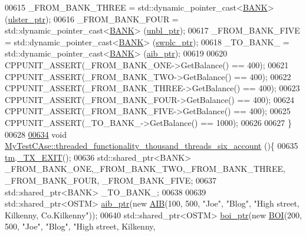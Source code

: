 \begin{DoxyCode}
00615     \_FROM\_BANK\_THREE = std::dynamic\_pointer\_cast<\hyperlink{class_b_a_n_k}{BANK}> (\hyperlink{class_my_test_c_ase_a4f9f72374d3d15be7cdf16412c4d7ed3_a4f9f72374d3d15be7cdf16412c4d7ed3}{ulster\_ptr});
00616     \_FROM\_BANK\_FOUR = std::dynamic\_pointer\_cast<\hyperlink{class_b_a_n_k}{BANK}> (\hyperlink{class_my_test_c_ase_a0ca634b597d6c0e136d632268853d5a7_a0ca634b597d6c0e136d632268853d5a7}{unbl\_ptr});
00617     \_FROM\_BANK\_FIVE = std::dynamic\_pointer\_cast<\hyperlink{class_b_a_n_k}{BANK}> (\hyperlink{class_my_test_c_ase_aa8ccae9a5a7feb5bc47591c55a82d0cd_aa8ccae9a5a7feb5bc47591c55a82d0cd}{swplc\_ptr});
00618     \_TO\_BANK\_ = std::dynamic\_pointer\_cast<\hyperlink{class_b_a_n_k}{BANK}> (\hyperlink{class_my_test_c_ase_adad50e8278b64aa0321000b528e5362c_adad50e8278b64aa0321000b528e5362c}{aib\_ptr});
00619     
00620     CPPUNIT\_ASSERT(\_FROM\_BANK\_ONE->GetBalance() == 400);
00621     CPPUNIT\_ASSERT(\_FROM\_BANK\_TWO->GetBalance() == 400);
00622     CPPUNIT\_ASSERT(\_FROM\_BANK\_THREE->GetBalance() == 400);
00623     CPPUNIT\_ASSERT(\_FROM\_BANK\_FOUR->GetBalance() == 400);
00624     CPPUNIT\_ASSERT(\_FROM\_BANK\_FIVE->GetBalance() == 400);
00625     CPPUNIT\_ASSERT(\_TO\_BANK\_->GetBalance() == 1000);
00626     
00627 \}
00628 
\hypertarget{_my_test_c_ase_8cpp_source.tex_l00634}{}\hyperlink{class_my_test_c_ase_ab7d15a71958588c6402f234e106668b1_ab7d15a71958588c6402f234e106668b1}{00634} \textcolor{keywordtype}{void} \hyperlink{class_my_test_c_ase_ab7d15a71958588c6402f234e106668b1_ab7d15a71958588c6402f234e106668b1}{MyTestCAse::threaded\_functionality\_thousand\_threads\_six\_account}
      ()\{
00635     \hyperlink{class_my_test_c_ase_a422e6e5d4ddedea384be96031c89b72b_a422e6e5d4ddedea384be96031c89b72b}{tm}.\hyperlink{class_t_m_a5e2d1127f2429f2f524d25f430eade06_a5e2d1127f2429f2f524d25f430eade06}{\_TX\_EXIT}();
00636     std::shared\_ptr<BANK> \_FROM\_BANK\_ONE,\_FROM\_BANK\_TWO,\_FROM\_BANK\_THREE, \_FROM\_BANK\_FOUR, \_FROM\_BANK\_FIVE;
00637     std::shared\_ptr<BANK> \_TO\_BANK\_;
00638     
00639     std::shared\_ptr<OSTM> \hyperlink{class_my_test_c_ase_adad50e8278b64aa0321000b528e5362c_adad50e8278b64aa0321000b528e5362c}{aib\_ptr}(\textcolor{keyword}{new} \hyperlink{class_a_i_b}{AIB}(100, 500, \textcolor{stringliteral}{"Joe"}, \textcolor{stringliteral}{"Blog"}, \textcolor{stringliteral}{"High street, Kilkenny,
       Co.Kilkenny"}));
00640     std::shared\_ptr<OSTM> \hyperlink{class_my_test_c_ase_a5554de9e3e6393a89c66c036c529720b_a5554de9e3e6393a89c66c036c529720b}{boi\_ptr}(\textcolor{keyword}{new} \hyperlink{class_b_o_i}{BOI}(200, 500, \textcolor{stringliteral}{"Joe"}, \textcolor{stringliteral}{"Blog"}, \textcolor{stringliteral}{"High street, Kilkenny,
}
\end{DoxyCode}
